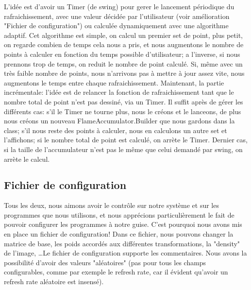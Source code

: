 \documentclass[a4paper]{article}
\begin{document}
L'idée est d'avoir un Timer (de swing) pour gerer le lancement périodique du rafraichissement, avec une valeur décidée par l'utilisateur (voir amélioration "Fichier de configuration") ou calculée dynamiquement avec une algorithme adaptif. Cet algorithme est simple, on calcul un premier set de point, plus petit, on regarde combien de temps cela nous a pris, et nous augmentons le nombre de points à calculer en fonction du temps possible d'utilisateur; a l'inverse, si nous prennons trop de temps, on reduit le nombre de point calculé. Si, même avec un très faible nombre de points, nous n'arrivons pas à mettre à jour assez vite, nous augmentons le temps entre chaque rafraichissement. Maintenant, la partie incrémentale: l'idée est de relancer la fonction de rafraichissement tant que le nombre total de point n'est pas dessiné, via un Timer. Il suffit après de gérer les différents cas: s'il le Timer ne tourne plus, nous le créons et le lanceons, de plus nous créons un nouveau FlameAccumulator.Builder que nous gardons dans la class; s'il nous reste des points à calculer, nous en calculons un autre set et l'affichons; si le nombre total de point est calculé, on arrète le Timer. Dernier cas, si la taille de l'accumulateur n'est pas le même que celui demandé par swing, on arrète le calcul.

\subsection*{Fichier de configuration}
Tous les deux, nous aimons avoir le contrôle sur notre système et sur les programmes que nous utilisons, et nous apprécions particulièrement le fait de pouvoir configurer les programmes à notre guise. C'est pourquoi nous avons mis en place un fichier de configuration! Dans ce fichier, nous pouvons changer la matrice de base, les poids accordés aux différentes transformations, la "density" de l'image, \ldots Le fichier de configuration supporte les commentaires. Nous avons la possibilité d'avoir des valeurs "aléatoires" (pas pour tous les champs configurables, comme par exemple le refresh rate, car il évident qu'avoir un refresh rate aléatoire est insensé).
\end{document}
